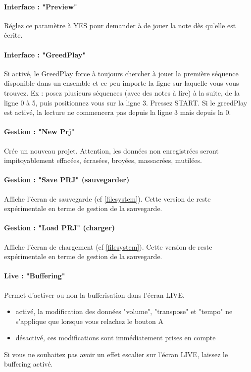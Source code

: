 \paragraph{Interface : "Preview"} Réglez ce paramètre à YES pour demander à \FAT de jouer la note dès qu'elle est écrite.

\paragraph{Interface : "GreedPlay"} Si activé, le GreedPlay force \FAT à toujours chercher à jouer la première séquence
                                    disponible dans un ensemble et ce peu importe la ligne sur laquelle vous vous trouvez.
                                    Ex : posez plusieurs séquences (avec des notes à lire) à la suite, de la ligne 0 à 5, puis positionnez vous sur la ligne 3.
                                    Pressez START. Si le greedPlay est activé, la lecture ne commencera pas depuis la ligne 3 mais depuis la 0.

\paragraph{Gestion : "New Prj"} Crée un nouveau projet.
                                Attention, les données non enregistrées seront impitoyablement effacées, écrasées, broyées, massacrées, mutilées.

\paragraph{Gestion : "Save PRJ" (sauvegarder)}  Affiche l'écran de sauvegarde (cf \ref{filesystem}).
                                                Cette version de \FAT reste expérimentale en terme de gestion de la sauvegarde.

\paragraph{Gestion : "Load PRJ" (charger)} Affiche l'écran de chargement (cf \ref{filesystem}).
                            Cette version de \FAT reste expérimentale en terme de gestion de la sauvegarde.

\paragraph{Live : "Buffering"}
Permet d'activer ou non la bufferisation dans l'écran LIVE.
\medskip

\begin{itemize}
    \item{activé, la modification des données "volume", "transpose" et "tempo" ne s'applique que lorsque vous relachez le bouton A}
    \item{désactivé, ces modifications sont immédiatement prises en compte}
\end{itemize}
\medskip
Si vous ne souhaitez pas avoir un effet escalier sur l'écran LIVE, laissez le buffering activé.
